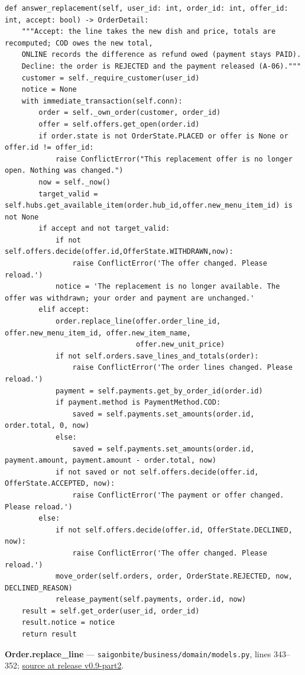 \begin{lstlisting}
def answer_replacement(self, user_id: int, order_id: int, offer_id: int, accept: bool) -> OrderDetail:
    """Accept: the line takes the new dish and price, totals are recomputed; COD owes the new total,
    ONLINE records the difference as refund owed (payment stays PAID).
    Decline: the order is REJECTED and the payment released (A-06)."""
    customer = self._require_customer(user_id)
    notice = None
    with immediate_transaction(self.conn):
        order = self._own_order(customer, order_id)
        offer = self.offers.get_open(order.id)
        if order.state is not OrderState.PLACED or offer is None or offer.id != offer_id:
            raise ConflictError("This replacement offer is no longer open. Nothing was changed.")
        now = self._now()
        target_valid = self.hubs.get_available_item(order.hub_id,offer.new_menu_item_id) is not None
        if accept and not target_valid:
            if not self.offers.decide(offer.id,OfferState.WITHDRAWN,now):
                raise ConflictError('The offer changed. Please reload.')
            notice = 'The replacement is no longer available. The offer was withdrawn; your order and payment are unchanged.'
        elif accept:
            order.replace_line(offer.order_line_id, offer.new_menu_item_id, offer.new_item_name,
                               offer.new_unit_price)
            if not self.orders.save_lines_and_totals(order):
                raise ConflictError('The order lines changed. Please reload.')
            payment = self.payments.get_by_order_id(order.id)
            if payment.method is PaymentMethod.COD:
                saved = self.payments.set_amounts(order.id, order.total, 0, now)
            else:
                saved = self.payments.set_amounts(order.id, payment.amount, payment.amount - order.total, now)
            if not saved or not self.offers.decide(offer.id, OfferState.ACCEPTED, now):
                raise ConflictError('The payment or offer changed. Please reload.')
        else:
            if not self.offers.decide(offer.id, OfferState.DECLINED, now):
                raise ConflictError('The offer changed. Please reload.')
            move_order(self.orders, order, OrderState.REJECTED, now, DECLINED_REASON)
            release_payment(self.payments, order.id, now)
    result = self.get_order(user_id, order_id)
    result.notice = notice
    return result
\end{lstlisting}
\textbf{Order.replace\_line} --- \texttt{saigonbite/\allowbreak{}business/\allowbreak{}domain/\allowbreak{}models.\allowbreak{}py}, lines 343--352; \href{\TargetRepo\detokenize{/blob/v0.9-part2/saigonbite/business/domain/models.py#L343-L352}}{source at release v0.9-part2}.

